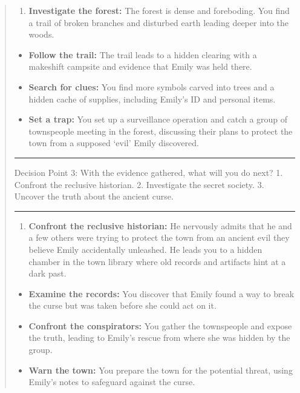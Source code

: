 \documentclass[fleqn,10pt]{wlscirep}
\providecommand{\tightlist}{%
  \setlength{\itemsep}{0pt}\setlength{\parskip}{0pt}}
\begin{document}
\begin{quote}
\begin{enumerate}
\def\labelenumi{\arabic{enumi}.}
\setcounter{enumi}{2}
\tightlist
\item
  \textbf{Investigate the forest:} The forest is dense and foreboding.
  You find a trail of broken branches and disturbed earth leading deeper
  into the woods.
\end{enumerate}

\begin{itemize}
\item
  \textbf{Follow the trail:} The trail leads to a hidden clearing with a
  makeshift campsite and evidence that Emily was held there.
\item
  \textbf{Search for clues:} You find more symbols carved into trees and
  a hidden cache of supplies, including Emily's ID and personal items.
\item
  \textbf{Set a trap:} You set up a surveillance operation and catch a
  group of townspeople meeting in the forest, discussing their plans to
  protect the town from a supposed `evil' Emily discovered.
\end{itemize}

\begin{center}\rule{0.5\linewidth}{0.5pt}\end{center}

Decision Point 3: With the evidence gathered, what will you do next? 1.
Confront the reclusive historian. 2. Investigate the secret society. 3.
Uncover the truth about the ancient curse.

\begin{center}\rule{0.5\linewidth}{0.5pt}\end{center}

\begin{enumerate}
\def\labelenumi{\arabic{enumi}.}
\tightlist
\item
  \textbf{Confront the reclusive historian:} He nervously admits that he
  and a few others were trying to protect the town from an ancient evil
  they believe Emily accidentally unleashed. He leads you to a hidden
  chamber in the town library where old records and artifacts hint at a
  dark past.
\end{enumerate}

\begin{itemize}
\item
  \textbf{Examine the records:} You discover that Emily found a way to
  break the curse but was taken before she could act on it.
\item
  \textbf{Confront the conspirators:} You gather the townspeople and
  expose the truth, leading to Emily's rescue from where she was hidden
  by the group.
\item
  \textbf{Warn the town:} You prepare the town for the potential threat,
  using Emily's notes to safeguard against the curse.
\end{itemize}


\end{quote}
\end{document}
